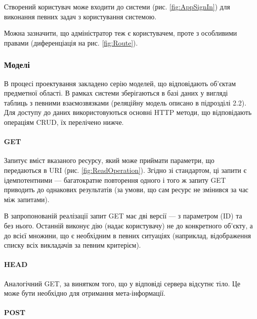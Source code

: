 Створений користувач може входити до системи (рис. \ref{fig:AppSignIn}) для виконання певних задач з користування системою.


Можна зазначити, що адміністратор теж є користувачем, проте з особливими правами (диференціація на рис. \ref{fig:Route}).

\subsubsection{Моделі}

В процесі проектування закладено серію моделей, що відповідають об’єктам предметної області. В рамках системи зберігаються в базі даних у вигляді таблиць з певними взаємозвязками (реляційну модель описано в підрозділі 2.2). Для доступу до даних використовуються основні HTTP методи, що відповідають операціям CRUD, їх перелічено нижче.

\paragraph{GET}

Запитує вміст вказаного ресурсу, який може приймати параметри, що передаються в URI (рис. \ref{fig:ReadOperation}). Згідно зі стандартом, ці запити є ідемпотентними — багатократне повторення одного і того ж запиту GET приводить до однакових результатів (за умови, що сам ресурс не змінився за час між запитами).

В запропонованій реалізації запит GET має дві версії — з параметром (ID) та без нього. Останній виконує дію (надає користувачу) не до конкретного об’єкту, а до всієї множини, що є необхідним в певних ситуаціях (наприклад, відображення списку всіх викладачів за певним критерієм).

\paragraph{HEAD}

Аналогічний GET, за винятком того, що у відповіді сервера відсутнє тіло. Це може бути необхідно для отримання мета-інформації.

\paragraph{POST}

